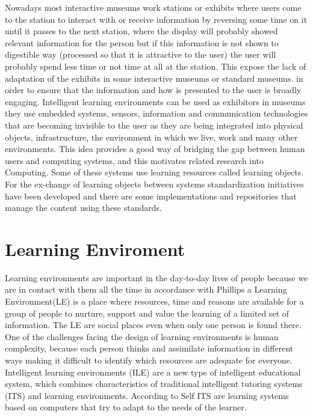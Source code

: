 Nowadays most interactive museums work stations or exhibits where users come to the station to interact with or receive information by reversing some time on it until it passes to the next station, where the display will probably showed relevant information for the person but if this information is not shown to digestible way (processed so that it is attractive to the user) the user will probably spend less time or not time at all at the station. This expose the lack of adaptation of the exhibits in some interactive museums or standard museums. in order to ensure that the information and how is presented to the user is broadly engaging. 
Intelligent learning environments can be used as exhibitors in museums they use embedded systems, sensors, information and communication technologies that are becoming invisible to the user as they are being integrated into physical objects, infrastructure, the environment in which we live, work and many other environments. This idea provides a good way of bridging the gap between human users and computing systems, and this motivates related research into Computing. Some of these systems use learning resources called learning objects. For the ex-change of learning objects between systems standardization initiatives have been developed and there are some implementations and repositories that manage the content using these standards. 

\section{Learning Enviroment}

Learning environments are important in the day-to-day lives of people because we are in contact with them all the time in accordance with Phillips\cite{PhilMcNaKenn2010zx} a Learning Environment(LE) is a place where resources, time and reasons are available for a group of people to nurture, support and value the learning of a limited set of information. The LE are social places even when only one person is found there. One of the challenges facing the design of learning environments is human complexity, because each person thinks and assimilate information in different ways making it difficult to identify which resources are adequate for everyone. Intelligent learning environments (ILE) are a new type of intelligent educational system, which combines characteristics of traditional intelligent tutoring systems (ITS) \cite{john1991} and learning environments. According to Self \cite{self1998} ITS are learning systems based on computers that try to adapt to the needs of the learner. 


